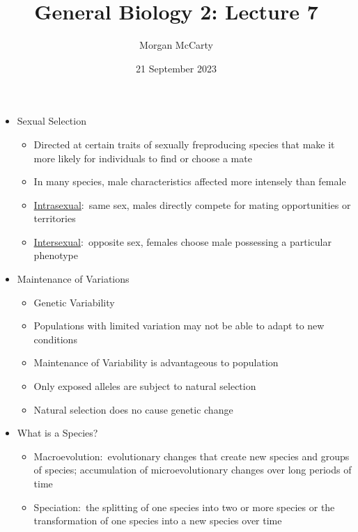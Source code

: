 \documentclass[12pt]{article}
\title{
    General Biology 2: Lecture 7}
\author{Morgan McCarty}
\date{21 September 2023}
\begin{document}
    \maketitle

    \begin{itemize}
        \item Sexual Selection
        \begin{itemize}
            \item Directed at certain traits of sexually freproducing species that make it more likely for individuals to find or choose a mate
            \item In many species, male characteristics affected more intensely than female
            \item \underline{Intrasexual}:\ same sex, males directly compete for mating opportunities or territories
            \item \underline{Intersexual}:\ opposite sex, females choose male possessing a particular phenotype
        \end{itemize}
        \item Maintenance of Variations
        \begin{itemize}
            \item Genetic Variability
            \item Populations with limited variation may not be able to adapt to new conditions
            \item Maintenance of Variability is advantageous to population
            \item Only exposed alleles are subject to natural selection
            \item Natural selection does no cause genetic change
        \end{itemize}
        \item What is a Species?
        \begin{itemize}
            \item Macroevolution:\ evolutionary changes that create new species and groups of species; accumulation of microevolutionary changes over long periods of time
            \item Speciation:\ the splitting of one species into two or more species or the transformation of one species into a new species over time
        \end{itemize}
    \end{itemize}
\end{document}
